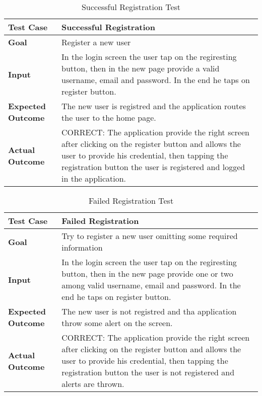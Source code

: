 \begin{table}[H]
	\centering
	\begin{tabular}{ll}
	\hline
	\textbf{Test Case}& Successful Registration\\
	\hline
	\textbf{Goal}& Register a new user\\
	\hline
	\textbf{Input}& In the login screen the user tap on the regiresting button, then in the new page provide a valid username, email and password. In the end he taps on register button.\\
	\hline
	\textbf{Expected Outcome}& The new user is registred and the application routes the user to the home page.\\
	\hline
	\textbf{Actual Outcome}& CORRECT: The application provide the right screen after clicking on the register button and allows the user to provide his credential, then tapping the registration button the user is registered and logged in the application.\\
	\hline	
	\end{tabular}
	\caption{Successful Registration Test}
\end{table}

\begin{table}[H]
	\centering
	\begin{tabular}{ll}
	\hline
	\textbf{Test Case}& Failed Registration\\
	\hline
	\textbf{Goal}& Try to register a new user omitting some required information\\
	\hline
	\textbf{Input}& In the login screen the user tap on the regiresting button, then in the new page provide one or two among valid username, email and password. In the end he taps on register button.\\
	\hline
	\textbf{Expected Outcome}& The new user is not registred and tha application throw some alert on the screen.\\
	\hline
	\textbf{Actual Outcome}& CORRECT: The application provide the right screen after clicking on the register button and allows the user to provide his credential, then tapping the registration button the user is not registered and alerts are thrown.\\
	\hline	
	\end{tabular}
	\caption{Failed Registration Test}
\end{table}


